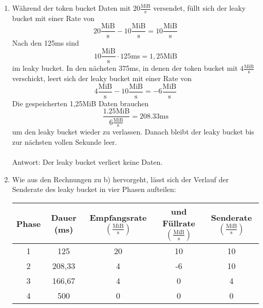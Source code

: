 \documentclass[a4paper,
			llpt,
			solution,
			accentcolor=tud2d,
			colorbacktitle
			]
			{tudexercise}
\newcommand{\MiBs}{\frac{\mathrm{MiB}}{\mathrm{s}}}
\begin{document}
\begin{enumerate}
\begin{multicols}{2}
\end{multicols}
\newpage
\item
Während der token bucket Daten mit $20\MiBs$ versendet, füllt sich der leaky bucket mit einer Rate von
$$
20 \MiBs - 10\MiBs = 10\MiBs
$$
Nach den 125ms sind
$$
10\MiBs  \cdot 125\mathrm{ms} = 1,25 \mathrm{MiB}
$$ im leaky bucket.
In den nächsten 375ms, in denen der token bucket mit $4\MiBs$ verschickt, leert sich der leaky bucket mit einer Rate von
$$
4\MiBs - 10\MiBs = -6 \MiBs
$$
Die gespeicherten 1,25MiB Daten brauchen
$$
\frac{1.25\mathrm{MiB}}{6\MiBs} = 208.33\mathrm{ms}
$$
um den leaky bucket wieder zu verlassen.
Danach bleibt der leaky bucket bis zur nächsten vollen Sekunde leer.
\\\\
Antwort: Der leaky bucket verliert keine Daten.
\item

Wie aus den Rechnungen zu b) hervorgeht, lässt sich der Verlauf der Senderate des leaky bucket in vier Phasen aufteilen:
\begin{center}
\begin{tabular}{|c|c|c|c|c|}
\hline
Phase 
&
Dauer (ms)
&
Empfangsrate $\left( \MiBs \right)$
&
und Füllrate $\left( \MiBs \right)$
&
Senderate $\left( \MiBs \right)$
\\ \hline
1 & 125    & 20 & 10 & 10 \\ \hline
2 & 208,33 &  4 & -6 & 10 \\ \hline
3 & 166,67 &  4 &  0 &  4 \\ \hline
4 & 500    &  0 &  0 &  0 \\ \hline
\end{tabular}
\end{center}
\begin{center}
\end{center}
\end{enumerate}
\section{}
\end{document}
